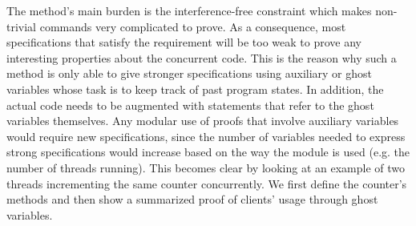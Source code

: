 The method's main burden is the \textsf{interference-free} constraint which makes non-trivial commands very complicated to prove. As a consequence, most specifications that satisfy the requirement will be too weak to prove any interesting properties about the concurrent code. This is the reason why such a method is only able to give stronger specifications using auxiliary or ghost variables whose task is to keep track of past program states. In addition, the actual code needs to be augmented with statements that refer to the ghost variables themselves. Any modular use of proofs that involve auxiliary variables would require new specifications, since the number of variables needed to express strong specifications would increase based on the way the module is used (e.g. the number of threads running). This becomes clear by looking at an example of two threads incrementing the same counter concurrently. We first define the counter's methods and then show a summarized proof \cite{modularsteps} of clients' usage through ghost variables.
